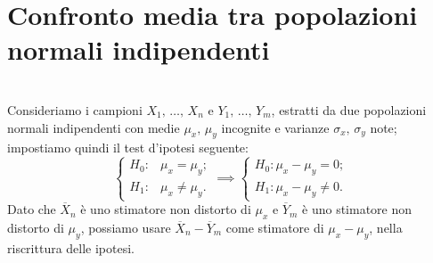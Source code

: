     \section{Confronto media tra popolazioni normali indipendenti}
        \begin{defn}[$\mu_x=\mu_y=\,?,\, \sigma^2_x=\sigma^2_{x,\,0},\, \sigma^2_y=\sigma^2_{y,\,0}$]
            \hfill \\
            Consideriamo i campioni $X_1,\, \ldots,\, X_{n}$ e $Y_1,\, \ldots,\, Y_{m}$, estratti da due 
            popolazioni normali indipendenti con medie $\mu_x,\, \mu_y$ incognite e varianze 
            $\sigma_x,\, \sigma_y$ note; impostiamo quindi il test d'ipotesi seguente: \[
            \begin{cases}
                H_0 : & \mu_x = \mu_y; \\
                H_1 : & \mu_x \neq \mu_y.
            \end{cases} \implies
            \begin{cases}
                H_0 : \mu_x -\mu_y = 0; \\
                H_1 : \mu_x -\mu_y \neq 0.
            \end{cases}
            \] Dato che $\overline{X}_n$ è uno stimatore non distorto di $\mu_x$ e $\overline{Y}_m$ è uno 
            stimatore non distorto di $\mu_y$, possiamo usare $\overline{X}_n -\overline{Y}_m$ come stimatore 
            di $\mu_x -\mu_y$, nella riscrittura delle ipotesi.


\end{defn}
